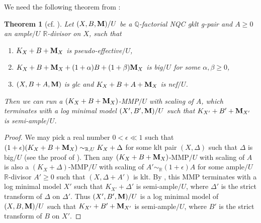 \documentclass[11pt]{amsart}
\numberwithin{equation}{section}
\newcommand{\Mm}{{\bf{M}}}
\newcommand{\Qq}{\mathbb{Q}}
\newcommand{\Rr}{\mathbb{R}}
\newtheorem{thm}{Theorem}[section]
\theoremstyle{definition}
\theoremstyle{definition}
\theoremstyle{definition}
\begin{document}
We need the following theorem from \cite{BZ16}:

\begin{thm}[{cf. \cite[Theorem 4.4(2)]{BZ16}}]\label{thm: bz16 4.4(2)}
Let $(X,B,\Mm)/U$ be a $\Qq$-factorial NQC gklt g-pair and $A\geq 0$ an ample$/U$ $\Rr$-divisor on $X$, such that 
\begin{enumerate}
    \item $K_X+B+\Mm_X$ is pseudo-effective$/U$,
    \item $K_X+B+\Mm_X+(1+\alpha)B+(1+\beta)\Mm_X$ is big$/U$ for some $\alpha,\beta\geq 0$,
    \item $(X,B+A,\Mm)$ is glc and $K_X+B+A+\Mm_X$ is nef$/U$.
\end{enumerate}
Then we can run a $(K_X+B+\Mm_X)$-MMP$/U$ with scaling of $A$, which terminates with a log minimal model $(X',B',\Mm)/U$ such that $K_{X'}+B'+\Mm_{X'}$ is semi-ample$/U$.
\end{thm}
\begin{proof}
We may pick a real number $0<\epsilon\ll 1$ such that $(1+\epsilon)(K_X+B+\Mm_X)\sim_{\Rr,U}K_X+\Delta$ for some klt pair $(X,\Delta)$ such that $\Delta$ is big$/U$ (see the proof of \cite[Theorem 4.4(2)]{BZ16}). Then any $(K_X+B+\Mm_X)$-MMP$/U$ with scaling of $A$ is also a $(K_X+\Delta)$-MMP$/U$ with scaling of $A'\sim_{\Rr}(1+\epsilon)A$ for some ample$/U$ $\Rr$-divisor $A'\geq 0$ such that $(X,\Delta+A')$ is klt. By \cite[Corollary 1.4,2]{BCHM10}, this MMP terminates with a log minimal model $X'$ such that $K_{X'}+\Delta'$ is semi-ample$/U$, where $\Delta'$ is the strict transform of $\Delta$ on $\Delta'$. Thus $(X',B',\Mm)/U$ is a log minimal model of $(X,B,\Mm)/U$ such that $K_{X'}+B'+\Mm_{X'}$ is semi-ample$/U$, where $B'$ is the strict transform of $B$ on $X'$.
\end{proof}
\end{document}
